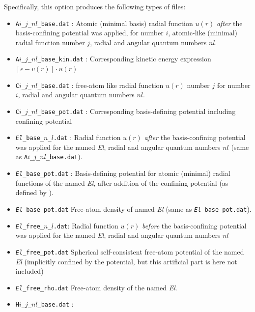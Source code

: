 Specifically, this option produces the following types of files:
\begin{itemize}
  \item \texttt{A$i$\_$j$\_$nl$\_base.dat} : Atomic (minimal basis)
    radial function $u(r)$ \emph{after} the basis-confining potential
    was applied, for  number $i$, atomic-like
    (minimal) radial function  number $j$, radial and angular quantum
    numbers $nl$.  
  \item \texttt{A$i$\_$j$\_$nl$\_base\_kin.dat} : Corresponding
    kinetic energy expression $[\epsilon - v(r)]\cdot u(r)$ 
  \item \texttt{C$i$\_$j$\_$nl$\_base.dat} :
     free-atom like radial function $u(r)$
      number $j$ for  number $i$, radial and angular
      quantum numbers $nl$. 
  \item \texttt{C$i$\_$j$\_$nl$\_base\_pot.dat} : Corresponding
    basis-defining potential including confining potential 
  \item \texttt{\emph{El}\_base\_$n$\_$l$.dat} : Radial function
    $u(r)$ \emph{after} the basis-confining potential was applied for
    the  named \emph{El}, radial and angular
      quantum numbers $nl$ (same as
    \texttt{A$i$\_$j$\_$nl$\_base.dat}). 
  \item \texttt{\emph{El}\_base\_pot.dat} : Basis-defining potential
    for atomic (minimal) radial functions of the 
    named \emph{El}, after addition of the confining potential (as
    defined by ).
  \item \texttt{\emph{El}\_base\_pot.dat} Free-atom density of
     named \emph{El} (same as
    \texttt{\emph{El}\_base\_pot.dat}). 
  \item  \texttt{\emph{El}\_free\_$n$\_$l$.dat}: Radial function
    $u(r)$ \emph{before} the basis-confining potential was applied for
    the  named \emph{El}, radial and angular
    quantum numbers $nl$
  \item \texttt{\emph{El}\_free\_pot.dat} Spherical self-consistent
    free-atom potential of the  named \emph{El}
    (implicitly confined by the 
    potential, but this artificial part is here not included)
  \item \texttt{\emph{El}\_free\_rho.dat} Free-atom density of
    the  named \emph{El}.
  \item \texttt{H$i$\_$j$\_$nl$\_base.dat} :

\end{itemize}
